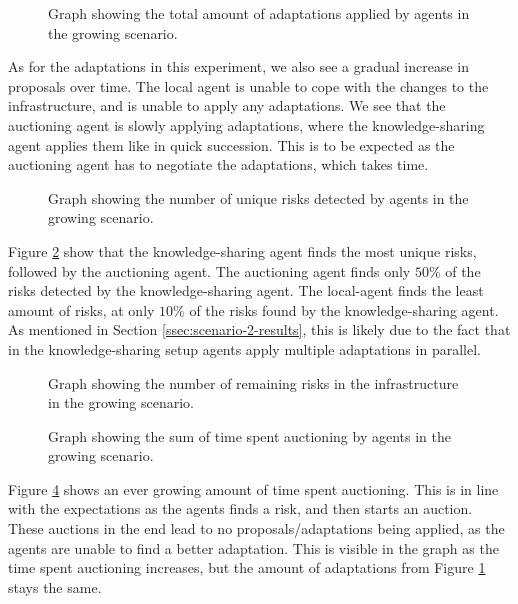 \begin{figure}[H]
    \centering
    
    \caption{Graph showing the total amount of adaptations applied by agents in the growing scenario.}
    \label{fig:proposals-growing}
\end{figure}

As for the adaptations in this experiment, we also see a gradual increase in proposals over time. The local agent is unable to cope with the changes to the infrastructure, and is unable to apply any adaptations. We see that the auctioning agent is slowly applying adaptations, where the knowledge-sharing agent applies them like in quick succession. This is to be expected as the auctioning agent has to negotiate the adaptations, which takes time.

\begin{figure}[H]
    \centering
        
    \caption{Graph showing the number of unique risks detected by agents in the growing scenario.}
    \label{fig:risk-count-growing}
\end{figure}

Figure \ref{fig:risk-count-growing} show that the knowledge-sharing agent finds the most unique risks, followed by the auctioning agent. The auctioning agent finds only $50\%$ of the risks detected by the knowledge-sharing agent. The local-agent finds the least amount of risks, at only $10\%$ of the risks found by the knowledge-sharing agent. As mentioned in Section \ref{ssec:scenario-2-results}, this is likely due to the fact that in the knowledge-sharing setup agents apply multiple adaptations in parallel. 

\begin{figure}[H]
    \centering
        
    \caption{Graph showing the number of remaining risks in the infrastructure in the growing scenario.}
    \label{fig:risk-remaining-growing}
\end{figure}


\begin{figure}[H]
    \hspace*{-1cm}
    \centering
        
    \caption{Graph showing the sum of time spent auctioning by agents in the growing scenario.}
    \label{fig:auctioning-time-growing}
\end{figure}

Figure \ref{fig:auctioning-time-growing} shows an ever growing amount of time spent auctioning. This is in line with the expectations as the agents finds a risk, and then starts an auction. These auctions in the end lead to no proposals/adaptations being applied, as the agents are unable to find a better adaptation. This is visible in the graph as the time spent auctioning increases, but the amount of adaptations from Figure \ref{fig:proposals-growing} stays the same.

